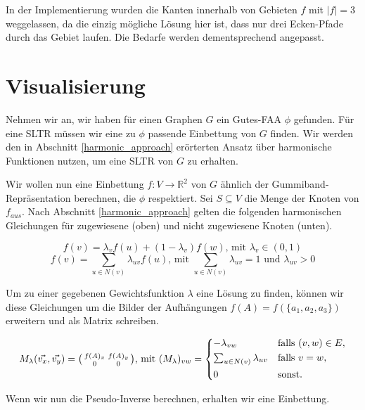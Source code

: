 \begin{remark}
In der Implementierung wurden die Kanten innerhalb von Gebieten $f$ mit $|f|=3$ weggelassen, da die einzig mögliche Lösung hier ist, dass nur drei Ecken-Pfade durch das Gebiet laufen. Die Bedarfe werden dementsprechend angepasst.
\end{remark}

\section{Visualisierung}\label{visualization}

Nehmen wir an, wir haben für einen Graphen $G$ ein Gutes-FAA $\phi$ gefunden. Für eine SLTR müssen wir eine zu $\phi$ passende Einbettung von $G$ finden. Wir werden den in Abschnitt \ref{harmonic_approach} erörterten Ansatz über harmonische Funktionen nutzen, um eine SLTR von $G$ zu erhalten.

Wir wollen nun eine Einbettung $f:V\to \mathbb{R}^2$ von $G$ ähnlich der Gummiband-Repräsentation berechnen, die $\phi$ respektiert. Sei $S \subseteq V$ die Menge der Knoten von $f_{aus}$. Nach Abschnitt \ref{harmonic_approach} gelten die folgenden harmonischen Gleichungen für zugewiesene (oben) und nicht zugewiesene Knoten (unten).

$$ f(v) = \lambda_v f(u) + (1-\lambda_v)f(w) \text{, mit } \lambda_v \in (0,1) $$
$$ f(v) = \sum_{u \in N(v)} \lambda_{uv} f(u) \text{, mit }  \sum_{u \in N(v)}\lambda_{uv} = 1 \text{ und } \lambda_{uv} > 0 $$

Um zu einer gegebenen Gewichtsfunktion $\lambda$ eine Lösung zu finden, können wir diese Gleichungen um die Bilder der Aufhängungen $f(A) = f(\{a_1,a_2,a_3\})$ erweitern und als Matrix schreiben.

\[ M_{\lambda}(\vec{v_x},\vec{v_y}) = \big( \begin{smallmatrix}f(A)_x&f(A)_y\\ 0&0\end{smallmatrix} \big) \text{, mit } (M_{\lambda})_{vw} =
	\begin{dcases}
	-\lambda_{vw} & \text{falls } (v,w) \in E, \\
	\textstyle\sum_{u \in N(v)} \lambda_{uv} & \text{falls } v = w, \\
	0 & \text{sonst.} \\
	\end{dcases}
\]

Wenn wir nun die Pseudo-Inverse berechnen, erhalten wir eine Einbettung.

